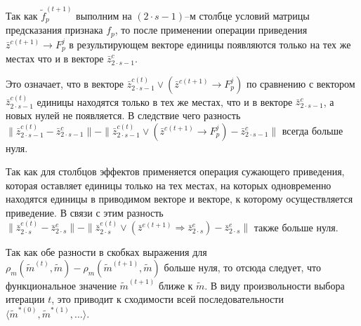 \begin{Proof}
	Так как $\tilde f_p^{(t+1)}$ выполним на $(2\cdot s-1)$–м столбце условий матрицы предсказания признака $f_p$, то после применении операции приведения $\bar z^{c(t+1)}\rightarrow F_p^j$ в результирующем векторе единицы появляются только на тех же местах что и в векторе $\bar z_{2\cdot s-1}^c$. 
	
	Это означает, что в векторе $\bar z_{2\cdot s-1}^{c(t)}\vee(\bar z^{c(t+1)}\rightarrow F_p^j)$ по сравнению с вектором $\bar z_{2\cdot s-1}^{c(t)}$  единицы находятся только в тех же местах, что и в векторе $\bar z_{2\cdot s-1}^c$, а новых нулей не появляется. В следствие чего разность $\|\bar z_{2\cdot s-1}^{c(t)}-\bar z_{2\cdot s-1}^c\|-\|\bar z_{2\cdot s-1}^{c(t)}\vee(\bar z^{c(t+1)}\rightarrow F_p^j)-\bar z_{2\cdot s-1}^c\|$ всегда больше нуля.
	
	Так как для столбцов эффектов применяется операция сужающего приведения, которая оставляет единицы только на тех местах, на которых одновременно находятся единицы в приводимом векторе и векторе, к которому осуществляется приведение. В связи с этим разность $\|\bar z_{2\cdot s}^{e(t)}-\bar z_{2\cdot s}^e\|-\|\bar z_{2\cdot s}^{e(t)}\vee(\bar z^{e(t+1)}\Rightarrow\bar z_{2\cdot s}^e)-\bar z_{2\cdot s}^e\|$ также больше нуля.
	
	Так как обе разности в скобках выражения для $\rho_m(\tilde m^{(t)},\tilde m)-\rho_m(\tilde m^{(t+1)},\tilde m)$ больше нуля, то отсюда следует, что функциональное значение $\tilde m^{(t+1)}$ ближе к $\tilde m$. В виду произвольности выбора итерации $t$, это приводит к сходимости всей последовательности $\langle\tilde m^{*(0)},\tilde m^{*(1)},\dots\rangle$. 
\end{Proof}


\clearpage